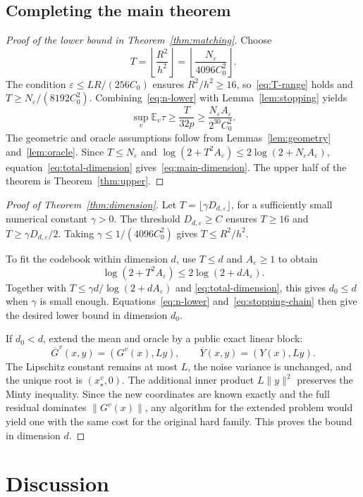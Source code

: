 \documentclass[11pt,a4paper]{article}
\newcommand{\E}{\mathbb E}
\newcommand{\eps}{\varepsilon}
\theoremstyle{definition}
\theoremstyle{remark}
\begin{document}
\subsection{Completing the main theorem}
\begin{proof}[Proof of the lower bound in Theorem~\ref{thm:matching}]
Choose
\[
 T=\left\lfloor\frac{R^2}{h^2}\right\rfloor
  =\left\lfloor\frac{N_\eps}{4096C_0^2}\right\rfloor.
\]
The condition $\eps\le LR/(256C_0)$ ensures $R^2/h^2\ge16$,
so~\eqref{eq:T-range} holds and
$T\ge N_\eps/(8192C_0^2)$. Combining~\eqref{eq:n-lower} with
Lemma~\ref{lem:stopping} yields
\[
 \sup_v\E_v\tau
 \ge\frac{T}{32p}
 \ge\frac{N_\eps A_\eps}{2^{30}C_0^2}.
\]
The geometric and oracle assumptions follow from
Lemmas~\ref{lem:geometry} and~\ref{lem:oracle}.
Since $T\le N_\eps$ and
$\log(2+T^2A_\eps)\le2\log(2+N_\eps A_\eps)$,
equation~\eqref{eq:total-dimension} gives~\eqref{eq:main-dimension}.
The upper half of the theorem is Theorem~\ref{thm:upper}.
\end{proof}

\begin{proof}[Proof of Theorem~\ref{thm:dimension}]
Let $T=\lfloor\gamma D_{d,\eps}\rfloor$, for a sufficiently small
numerical constant $\gamma>0$. The threshold $D_{d,\eps}\ge C$ ensures
$T\ge16$ and $T\ge\gamma D_{d,\eps}/2$.
Taking $\gamma\le1/(4096C_0^2)$ gives $T\le R^2/h^2$.

To fit the codebook within dimension $d$, use $T\le d$ and $A_\eps\ge1$
to obtain
\[
 \log(2+T^2A_\eps)\le2\log(2+dA_\eps).
\]
Together with $T\le\gamma d/\log(2+dA_\eps)$ and
\eqref{eq:total-dimension}, this gives $d_0\le d$ when $\gamma$ is small
enough. Equations~\eqref{eq:n-lower} and~\eqref{eq:stopping-chain} then
give the desired lower bound in dimension $d_0$.

If $d_0<d$, extend the mean and oracle by a public exact linear block:
\[
 \overline G^v(x,y)=(G^v(x),Ly),\qquad
 \overline Y(x,y)=(Y(x),Ly).
\]
The Lipschitz constant remains at most $L$, the noise variance is unchanged,
and the unique root is $(x_\star^v,0)$. The additional inner product
$L\|y\|^2$ preserves the Minty inequality. Since the new coordinates are
known exactly and the full residual dominates $\|G^v(x)\|$, any algorithm
for the extended problem would yield one with the same cost for the
original hard family. This proves the bound in dimension $d$.
\end{proof}

\section{Discussion}\label{sec:discussion}
\end{document}
